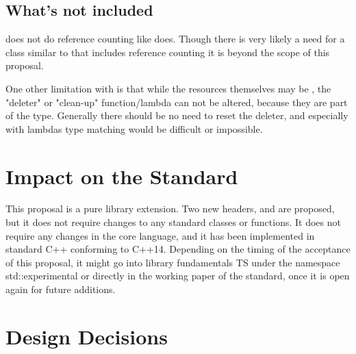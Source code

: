 \documentclass[ebook,11pt,article]{memoir}
\begin{document}
\section{What's not included}
 does not do reference counting like  does.  Though there is very likely a need for a class similar to  that includes reference counting it is beyond the scope of this proposal.

One other limitation with  is that while the resources themselves may be , the "deleter" or "clean-up" function/lambda can not be altered, because they are part of the type.  Generally there should be no need to reset the deleter, and especially with lambdas type matching would be difficult or impossible.

\chapter{Impact on the Standard}
This proposal is a pure library extension. Two new headers,  and  are proposed, but it does not require changes to any standard classes or functions. It does not require any changes in the core language, and it has been implemented in standard C++ conforming to C++14. Depending on the timing of the acceptance of this proposal, it might go into library fundamentals TS under the namespace std::experimental or directly in the working paper of the standard, once it is open again for future additions.

\chapter{Design Decisions}
\end{document}
